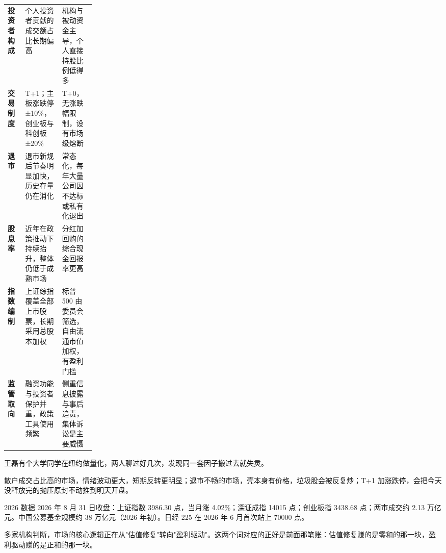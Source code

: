 \begin{tablewrap}
\begin{xltabular}{\linewidth}{>{\raggedright\arraybackslash}p{0.20\linewidth}XX}
\toprule
{} &  &  \\
\midrule
\textbf{投资者构成} & 个人投资者贡献的成交额占比长期偏高 & 机构与被动资金主导，个人直接持股比例低得多 \\
\textbf{交易制度} & T+1；主板涨跌停 ±10\%，创业板与科创板 ±20\% & T+0，无涨跌幅限制，设有市场级熔断 \\
\textbf{退市} & 退市新规后节奏明显加快，历史存量仍在消化 & 常态化，每年大量公司因不达标或私有化退出 \\
\textbf{股息率} & 近年在政策推动下持续抬升，整体仍低于成熟市场 & 分红加回购的综合现金回报率更高 \\
\textbf{指数编制} & 上证综指覆盖全部上市股票，长期采用总股本加权 & 标普 500 由委员会筛选，自由流通市值加权，有盈利门槛 \\
\textbf{监管取向} & 融资功能与投资者保护并重，政策工具使用频繁 & 侧重信息披露与事后追责，集体诉讼是主要威慑 \\
\bottomrule
\end{xltabular}
\end{tablewrap}

王磊有个大学同学在纽约做量化，两人聊过好几次，发现同一套因子搬过去就失灵。

散户成交占比高的市场，情绪波动更大，短期反转更明显；退市不畅的市场，壳本身有价格，垃圾股会被反复炒；T+1 加涨跌停，会把今天没释放完的抛压原封不动推到明天开盘。

\begin{databox}{2026 数据}
2026 年 8 月 31 日收盘：上证指数 3986.30 点，当月涨 4.02\%；深证成指 14015 点；创业板指 3438.68 点；两市成交约 2.13 万亿元。中国公募基金规模约 38 万亿元（2026 年初）。日经 225 在 2026 年 6 月首次站上 70000 点。

多家机构判断，市场的核心逻辑正在从"估值修复"转向"盈利驱动"。这两个词对应的正好是前面那笔账：估值修复赚的是零和的那一块，盈利驱动赚的是正和的那一块。

\end{databox}

